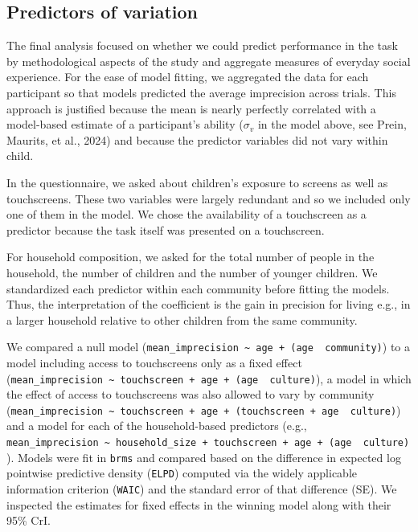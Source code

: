 \documentclass[
  man,floatsintext]{apa7}
\begin{document}
\hypertarget{predictors-of-variation}{%
\subsection{Predictors of variation}\label{predictors-of-variation}}

The final analysis focused on whether we could predict performance in the task by methodological aspects of the study and aggregate measures of everyday social experience. For the ease of model fitting, we aggregated the data for each participant so that models predicted the average imprecision across trials. This approach is justified because the mean is nearly perfectly correlated with a model-based estimate of a participant's ability (\(\sigma_v\) in the model above, see Prein, Maurits, et al., 2024) and because the predictor variables did not vary within child.

In the questionnaire, we asked about children's exposure to screens as well as touchscreens. These two variables were largely redundant and so we included only one of them in the model. We chose the availability of a touchscreen as a predictor because the task itself was presented on a touchscreen.

For household composition, we asked for the total number of people in the household, the number of children and the number of younger children. We standardized each predictor within each community before fitting the models. Thus, the interpretation of the coefficient is the gain in precision for living e.g., in a larger household relative to other children from the same community.

We compared a null model (\texttt{mean\_imprecision\ \textasciitilde{}\ age\ +\ (age\ \textbar{}\ community)}) to a model including access to touchscreens only as a fixed effect (\texttt{mean\_imprecision\ \textasciitilde{}\ touchscreen\ +\ age\ +\ (age\ \textbar{}\ culture)}), a model in which the effect of access to touchscreens was also allowed to vary by community (\texttt{mean\_imprecision\ \textasciitilde{}\ touchscreen\ +\ age\ +\ (touchscreen\ +\ age\ \textbar{}\ culture)}) and a model for each of the household-based predictors (e.g., \texttt{mean\_imprecision\ \textasciitilde{}\ household\_size\ +\ touchscreen\ +\ age\ +\ (age\ \textbar{}\ culture)}). Models were fit in \texttt{brms} and compared based on the difference in expected log pointwise predictive density (\texttt{ELPD}) computed via the widely applicable information criterion (\texttt{WAIC}) and the standard error of that difference (SE). We inspected the estimates for fixed effects in the winning model along with their 95\% CrI.
\end{document}
